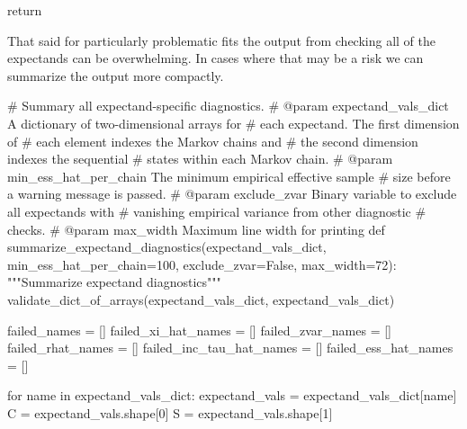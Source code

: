 \documentclass[
  letterpaper,
  DIV=11,
  numbers=noendperiod]{scrartcl}
\newenvironment{Shaded}{\begin{snugshade}}{\end{snugshade}}
\newcommand{\CommentTok}[1]{\textcolor[rgb]{0.37,0.37,0.37}{#1}}
\newcommand{\ControlFlowTok}[1]{\textcolor[rgb]{0.00,0.23,0.31}{#1}}
\newcommand{\DecValTok}[1]{\textcolor[rgb]{0.68,0.00,0.00}{#1}}
\newcommand{\KeywordTok}[1]{\textcolor[rgb]{0.00,0.23,0.31}{#1}}
\newcommand{\NormalTok}[1]{\textcolor[rgb]{0.00,0.23,0.31}{#1}}
\newcommand{\OperatorTok}[1]{\textcolor[rgb]{0.37,0.37,0.37}{#1}}
\newcommand{\StringTok}[1]{\textcolor[rgb]{0.13,0.47,0.30}{#1}}
\newcommand{\VariableTok}[1]{\textcolor[rgb]{0.07,0.07,0.07}{#1}}
\begin{document}
\begin{Shaded}
\begin{Highlighting}[]
  \ControlFlowTok{return}
\end{Highlighting}
\end{Shaded}

That said for particularly problematic fits the output from checking all
of the expectands can be overwhelming. In cases where that may be a risk
we can summarize the output more compactly.

\begin{Shaded}
\begin{Highlighting}[]
\CommentTok{\# Summary all expectand{-}specific diagnostics.}
\CommentTok{\# @param expectand\_vals\_dict A dictionary of two{-}dimensional arrays for}
\CommentTok{\#                            each expectand.  The first dimension of}
\CommentTok{\#                            each element indexes the Markov chains and}
\CommentTok{\#                            the second dimension indexes the sequential}
\CommentTok{\#                            states within each Markov chain.}
\CommentTok{\# @param min\_ess\_hat\_per\_chain The minimum empirical effective sample}
\CommentTok{\#                              size before a warning message is passed.}
\CommentTok{\# @param exclude\_zvar Binary variable to exclude all expectands with}
\CommentTok{\#                     vanishing empirical variance from other diagnostic}
\CommentTok{\#                     checks.}
\CommentTok{\# @param max\_width Maximum line width for printing}
\KeywordTok{def}\NormalTok{ summarize\_expectand\_diagnostics(expectand\_vals\_dict,}
\NormalTok{                                    min\_ess\_hat\_per\_chain}\OperatorTok{=}\DecValTok{100}\NormalTok{,}
\NormalTok{                                    exclude\_zvar}\OperatorTok{=}\VariableTok{False}\NormalTok{,}
\NormalTok{                                    max\_width}\OperatorTok{=}\DecValTok{72}\NormalTok{):}
  \CommentTok{"""Summarize expectand diagnostics"""}
\NormalTok{  validate\_dict\_of\_arrays(expectand\_vals\_dict, }\StringTok{\textquotesingle{}expectand\_vals\_dict\textquotesingle{}}\NormalTok{)}

\NormalTok{  failed\_names }\OperatorTok{=}\NormalTok{ []}
\NormalTok{  failed\_xi\_hat\_names }\OperatorTok{=}\NormalTok{ []}
\NormalTok{  failed\_zvar\_names }\OperatorTok{=}\NormalTok{ []}
\NormalTok{  failed\_rhat\_names }\OperatorTok{=}\NormalTok{ []}
\NormalTok{  failed\_inc\_tau\_hat\_names }\OperatorTok{=}\NormalTok{ []}
\NormalTok{  failed\_ess\_hat\_names }\OperatorTok{=}\NormalTok{ []}

  \ControlFlowTok{for}\NormalTok{ name }\KeywordTok{in}\NormalTok{ expectand\_vals\_dict:}
\NormalTok{    expectand\_vals }\OperatorTok{=}\NormalTok{ expectand\_vals\_dict[name]}
\NormalTok{    C }\OperatorTok{=}\NormalTok{ expectand\_vals.shape[}\DecValTok{0}\NormalTok{]}
\NormalTok{    S }\OperatorTok{=}\NormalTok{ expectand\_vals.shape[}\DecValTok{1}\NormalTok{]}


\end{Highlighting}
\end{Shaded}
\end{document}
